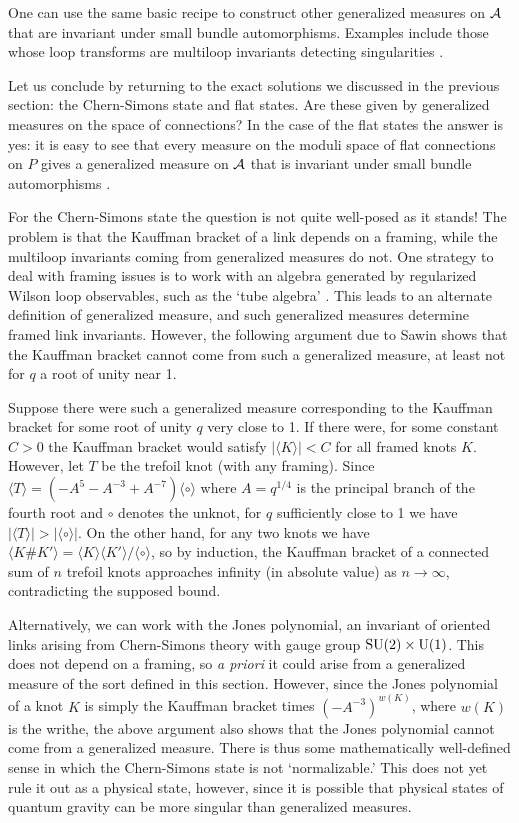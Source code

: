 One can use the same basic recipe to construct other
generalized measures on ${\cal A}$ that are invariant under small bundle
automorphisms.  Examples include those whose loop transforms are
multiloop invariants detecting singularities \cite{Baez2}.

Let us conclude by returning to the exact solutions we discussed in the
previous section: the Chern-Simons state and flat states.  Are these
given by generalized measures on the space of connections?  In the case
of the flat states the answer is yes: it is easy to see that every
measure on the moduli space of flat connections on $P$ gives a
generalized measure on ${\cal A}$ that is invariant under small bundle
automorphisms \cite{Baez2}.

For the Chern-Simons state the question is not quite well-posed as it
stands!  The problem is that the Kauffman bracket of a link depends on a
framing, while the multiloop invariants coming from generalized measures
do not.  One strategy to deal with framing issues is to work with an
algebra generated by regularized Wilson loop observables, such as the
`tube algebra' \cite{Baez2.5}.  This leads to an alternate definition
of generalized measure, and such generalized measures determine
framed link invariants.  However, the following argument due to
Sawin \cite{Sawin} shows that the Kauffman bracket cannot come from such
a generalized measure, at least not for $q$ a root of unity near 1.

Suppose there were such a generalized measure corresponding to the
Kauffman bracket for some root of unity $q$ very close to 1.  If there
were, for some constant $C > 0$ the Kauffman bracket would satisfy
$|\langle K\rangle| < C$ for all framed knots $K$.  However, let $T$ be
the trefoil knot (with any framing).  Since $\langle T \rangle = (-A^5 -
A^{-3} + A^{-7})\langle \circ \rangle$ where $A = q^{1/4}$ is the
principal branch of the fourth root and $\circ$ denotes the unknot, for
$q$ sufficiently close to 1 we have $|\langle T\rangle | > |\langle
\circ \rangle|$.  On the other hand, for any two knots we have $\langle
K \# K'\rangle = \langle K \rangle \langle K' \rangle /\langle \circ
\rangle$, so by induction, the Kauffman bracket of a connected sum of
$n$ trefoil knots approaches infinity (in absolute value) as $n \to
\infty$, contradicting the supposed bound.

Alternatively, we can work with the Jones polynomial, an invariant of
oriented links arising from Chern-Simons theory with gauge group ${\rm SU}(2)
\times {\rm U}(1)$.  This does not depend on a framing, so {\it a priori} it
could arise from a generalized measure of the sort defined in this
section.  However, since the Jones polynomial of a knot $K$ is simply
the Kauffman bracket times $(-A^{-3})^{w(K)}$, where $w(K)$ is the
writhe, the above argument also shows that the Jones polynomial cannot
come from a generalized measure.  There is thus some mathematically
well-defined sense in which the Chern-Simons state is not
`normalizable.'  This does not yet rule it out as a physical state,
however, since it is possible that physical states of quantum gravity
can be more singular than generalized measures.

